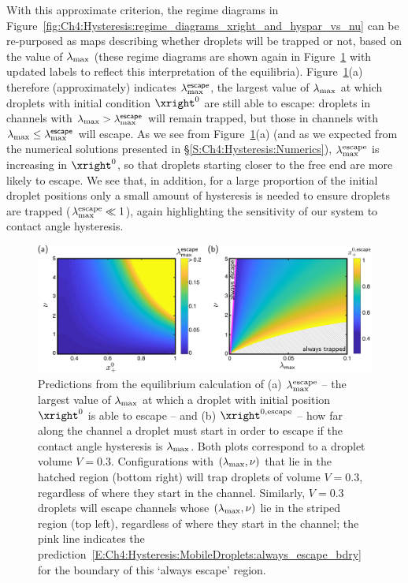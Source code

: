 With this approximate criterion, the regime diagrams in Figure~\ref{fig:Ch4:Hysteresis:regime_diagrams_xright_and_hyspar_vs_nu} can be re-purposed as maps describing whether droplets will be trapped or not, based on the value of $\lambda_{\text{max}}$ (these regime diagrams are shown again in Figure~\ref{fig:xright_and_hyspar_regime_diagrams} with updated labels to reflect this interpretation of the equilibria). Figure~\ref{fig:xright_and_hyspar_regime_diagrams}(a) therefore (approximately) indicates $\lambda_{\text{max}}^{\textsf{escape}}$, the largest value of $\lambda_{\text{max}}$ at which droplets with initial condition $\xright^0$ are still able to escape: droplets in channels with  $\lambda_{\text{max}} > \lambda_{\text{max}}^{\textsf{escape}}$ will remain trapped, but those in channels with $\lambda_{\text{max}} \leq \lambda_{\text{max}}^{\textsf{escape}}$ will escape. As we see from Figure~\ref{fig:xright_and_hyspar_regime_diagrams}(a) (and as we expected from the numerical solutions presented in \S\ref{S:Ch4:Hysteresis:Numerics}), $\lambda_{\text{max}}^{\text{escape}}$ is increasing in $\xright^0$, so that droplets starting closer to the free end are more likely to escape. We see that, in addition, for a large proportion of the initial droplet positions only a small amount of hysteresis is needed to ensure droplets are trapped ($\lambda_{\text{max}}^{\text{escape}} \ll 1$), again highlighting the sensitivity of our system to contact angle hysteresis.

\begin{figure}[t]
\centering
\includegraphics[width = \textwidth]{xright0_and_hysparmax_regime_diagram}
\caption{Predictions from the equilibrium calculation of (a) $\lambda_{\text{max}}^{\text{escape}}$ -- the largest value of $\lambda_{\text{max}}$ at which a droplet with initial position $\xright^0$ is able to escape -- and (b) $\xright^{0,\text{escape}}$ -- how far along the channel a droplet must start in order to escape if the contact angle hysteresis is $\lambda_{\text{max}}$. Both plots correspond to a droplet volume $V = 0.3$. Configurations with $(\lambda_{\text{max}}, \nu)$ that lie in the hatched region (bottom right) will trap droplets of volume $V = 0.3$, regardless of where they start in the channel. Similarly, $V = 0.3$ droplets will escape channels whose $(\lambda_{\text{max}}, \nu)$ lie in the striped region (top left), regardless of where they start in the channel; the pink line indicates the prediction~\eqref{E:Ch4:Hysteresis:MobileDroplets:always_escape_bdry} for the boundary of this `always escape' region.}\label{fig:xright_and_hyspar_regime_diagrams}
\end{figure}

